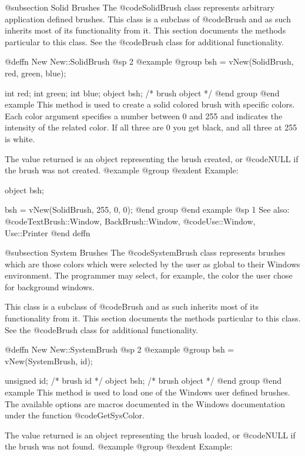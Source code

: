 @subsection Solid Brushes
The @code{SolidBrush} class represents arbitrary application defined
brushes.  This class is a subclass of @code{Brush} and as such inherits
most of its functionality from it.  This section documents the methods
particular to this class.  See the @code{Brush} class for additional
functionality.






@deffn {New} New::SolidBrush
@sp 2
@example
@group
bsh = vNew(SolidBrush, red, green, blue);

int     red;
int     green;
int     blue;
object  bsh;    /*  brush object  */
@end group
@end example
This method is used to create a solid colored brush with specific colors.
Each color argument specifies a number between 0 and 255 and indicates
the intensity of the related color.  If all three are 0 you get black,
and all three at 255 is white.

The value returned is an object representing the brush created, or
@code{NULL} if the brush was not created.
@example
@group
@exdent Example:

object  bsh;

bsh = vNew(SolidBrush, 255, 0, 0);
@end group
@end example
@sp 1
See also:  @code{TextBrush::Window, BackBrush::Window,}
        @code{Use::Window, Use::Printer}
@end deffn




@subsection System Brushes
The @code{SystemBrush} class represents brushes which are those colors
which were selected by the user as global to their Windows environment.
The programmer may select, for example, the color the user chose for
background windows.

This class is a subclass of @code{Brush} and as such inherits
most of its functionality from it.  This section documents the methods
particular to this class.  See the @code{Brush} class for additional
functionality.








@deffn {New} New::SystemBrush
@sp 2
@example
@group
bsh = vNew(SystemBrush, id);

unsigned id;    /*  brush id      */
object  bsh;    /*  brush object  */
@end group
@end example
This method is used to load one of the Windows user defined brushes.
The available options are macros documented in the Windows documentation
under the function @code{GetSysColor}.

The value returned is an object representing the brush loaded, or
@code{NULL} if the brush was not found.
@example
@group
@exdent Example:

